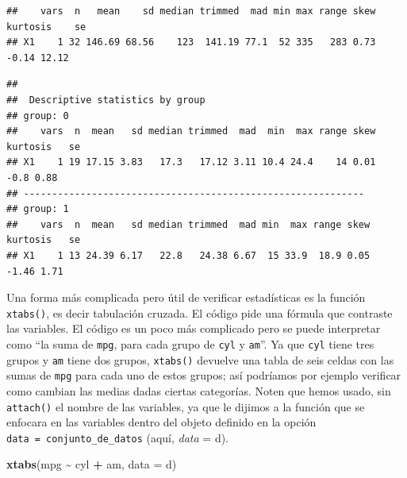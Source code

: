 \documentclass[
]{article}
\newenvironment{Shaded}{\begin{snugshade}}{\end{snugshade}}
\newcommand{\AttributeTok}[1]{\textcolor[rgb]{0.13,0.29,0.53}{#1}}
\newcommand{\CommentTok}[1]{\textcolor[rgb]{0.56,0.35,0.01}{\textit{#1}}}
\newcommand{\FunctionTok}[1]{\textcolor[rgb]{0.13,0.29,0.53}{\textbf{#1}}}
\newcommand{\NormalTok}[1]{#1}
\newcommand{\SpecialCharTok}[1]{\textcolor[rgb]{0.81,0.36,0.00}{\textbf{#1}}}
\begin{document}
\begin{verbatim}
##    vars  n   mean    sd median trimmed  mad min max range skew kurtosis    se
## X1    1 32 146.69 68.56    123  141.19 77.1  52 335   283 0.73    -0.14 12.12
\end{verbatim}

\begin{Shaded}
\end{Shaded}

\begin{verbatim}
## 
##  Descriptive statistics by group 
## group: 0
##    vars  n  mean   sd median trimmed  mad  min  max range skew kurtosis   se
## X1    1 19 17.15 3.83   17.3   17.12 3.11 10.4 24.4    14 0.01     -0.8 0.88
## ------------------------------------------------------------ 
## group: 1
##    vars  n  mean   sd median trimmed  mad min  max range skew kurtosis   se
## X1    1 13 24.39 6.17   22.8   24.38 6.67  15 33.9  18.9 0.05    -1.46 1.71
\end{verbatim}

Una forma más complicada pero útil de verificar estadísticas es la
función \texttt{xtabs()}, es decir tabulación cruzada. El código pide
una fórmula que contraste las variables. El código es un poco más
complicado pero se puede interpretar como ``la suma de \texttt{mpg},
para cada grupo de \texttt{cyl} y \texttt{am}''. Ya que \texttt{cyl}
tiene tres grupos y \texttt{am} tiene dos grupos, \texttt{xtabs()}
devuelve una tabla de seis celdas con las sumas de \texttt{mpg} para
cada uno de estos grupos; así podríamos por ejemplo verificar como
cambian las medias dadas ciertas categorías. Noten que hemos usado, sin
\texttt{attach()} el nombre de las variables, ya que le dijimos a la
función que se enfocara en las variables dentro del objeto definido en
la opción \texttt{data\ =\ conjunto\_de\_datos} (aquí, \emph{data} = d).

\begin{Shaded}
\begin{Highlighting}[]
\FunctionTok{xtabs}\NormalTok{(mpg }\SpecialCharTok{\textasciitilde{}}\NormalTok{ cyl }\SpecialCharTok{+}\NormalTok{ am, }\AttributeTok{data =}\NormalTok{ d)}
\end{Highlighting}
\end{Shaded}
\end{document}

